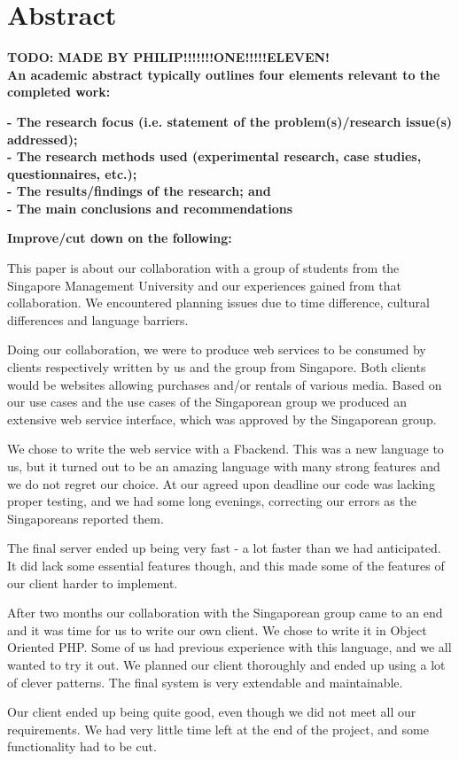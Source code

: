 \section*{Abstract}

\textbf{TODO: MADE BY PHILIP!!!!!!!ONE!!!!!ELEVEN!}\\
\textbf{An academic abstract typically outlines four elements relevant to the completed work:}

    \textbf{- The research focus (i.e. statement of the problem(s)/research issue(s) addressed);}\\
    \textbf{- The research methods used (experimental research, case studies, questionnaires, etc.);}\\
    \textbf{- The results/findings of the research; and}\\
    \textbf{ - The main conclusions and recommendations}
    
\textbf{Improve/cut down on the following:}

This paper is about our collaboration with a group of students from the Singapore Management University and our experiences gained from that collaboration. We encountered planning issues due to time difference, cultural differences and language barriers.

Doing our collaboration, we were to produce web services to be consumed by clients respectively written by us and the group from Singapore. Both clients would be websites allowing purchases and/or rentals of various media.
Based on our use cases and the use cases of the Singaporean group we produced an extensive web service interface, which was approved by the Singaporean group.

We chose to write the web service with a F\Sh backend. This was a new language to us, but it turned out to be an amazing language with many strong features and we do not regret our choice.
At our agreed upon deadline our code was lacking proper testing, and we had some long evenings, correcting our errors as the Singaporeans reported them.

The final server ended up being very fast - a lot faster than we had anticipated. It did lack some essential features though, and this made some of the features of our client harder to implement.

After two months our collaboration with the Singaporean group came to an end and it was time for us to write our own client. We chose to write it in Object Oriented PHP. Some of us had previous experience with this language, and we all wanted to try it out. We planned our client thoroughly and ended up using a lot of clever patterns. The final system is very extendable and maintainable.

Our client ended up being quite good, even though we did not meet all our requirements. We had very little time left at the end of the project, and some functionality had to be cut.
\newpage